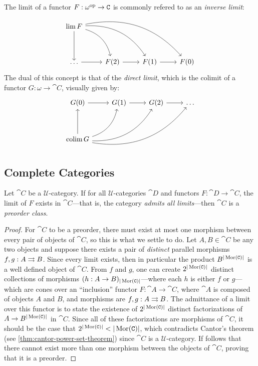 \begin{example}
\label{exp:inv-dir-limit}
The limit of a functor \(F: \omega^{\mathrm{op}} \to \texttt C\) is commonly refered to as
an \emph{inverse limit}:
\[
\begin{tikzcd}
\Lim F \ar[dd] \ar[drd, bend left] \ar[drdr, bend left] \ar[rdrdr, bend left]
&&& \\
&&& \\
\dots \ar[r] &F(2) \ar[r] &F(1) \ar[r] &F(0)
\end{tikzcd}
\]
The dual of this concept is that of the \emph{direct limit}, which is the
colimit of a functor \(G: \omega \to \cat C\), visually given by:
\[
\begin{tikzcd}
G(0) \ar[r] &G(1) \ar[r] &G(2) \ar[r] &\dots \\
&&&\\
\Colim G
\ar[uu] \ar[uru, bend right] \ar[urur, bend right] \ar[rurur, bend right]
&&&
\end{tikzcd}
\]
\end{example}

\subsection{Complete Categories}

\begin{proposition}
\label{prop:all-limits-is-preorder}
Let \(\cat C\) be a \(\mathcal{U}\)-category. If for all
\(\mathcal{U}\)-categories \(\cat D\) and functors \(F: \cat D \to \cat C\), the
limit of \(F\) exists in \(\cat C\)---that is, the category \emph{admits all
  limits}---then \(\cat C\) is a \emph{preorder class}.
\end{proposition}

\begin{proof}
For \(\cat C\) to be a preorder, there must exist at most one morphism between
every pair of objects of \(\cat C\), so this is what we settle to do. Let
\(A, B \in \cat C\) be any two objects and suppose there exists a pair of
\emph{distinct} parallel morphisms \(f, g: A \rightrightarrows B\). Since every limit
exists, then in particular the product \(B^{|\operatorname{Mor}(\texttt C)|}\) is a well defined
object of \(\cat C\). From \(f\) and \(g\), one can create
\(2^{|\operatorname{Mor}(\texttt C)|}\) distinct collections of morphisms
\((h: A \to B)_{|\operatorname{Mor}(\texttt C)|}\)---where each \(h\) is either \(f\) or
\(g\)---which are cones over an ``inclusion'' functor \(F: \cat A \to \cat C\),
where \(\cat A\) is composed of objects \(A\) and \(B\), and morphisms are
\(f, g: A \rightrightarrows B\). The admittance of a limit over this functor is to state the
existence of \(2^{|\operatorname{Mor}(\texttt C)|}\) distinct factorizations of
\(A \to B^{|\operatorname{Mor}(\texttt C)|}\) in \(\cat C\). Since all of these factorizations
are morphisms of \(\cat C\), it should be the case that
\(2^{|\operatorname{Mor}(\texttt C)|} < |\operatorname{Mor}(\texttt C)|\), which contradicts Cantor's theorem (see
\cref{thm:cantor-power-set-theorem}) since \(\cat C\) is a
\(\mathcal{U}\)-category. If follows that there cannot exist more than one
morphism between the objects of \(\cat C\), proving that it is a preorder.
\end{proof}

